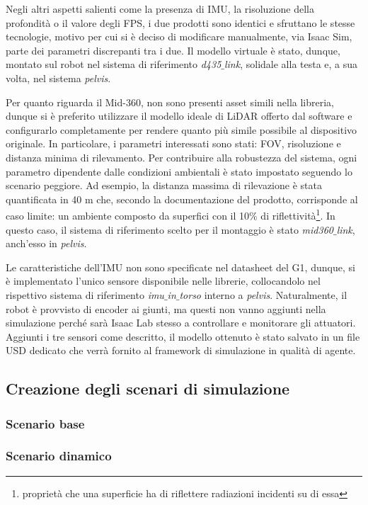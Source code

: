 Negli altri aspetti salienti come la presenza di IMU, la risoluzione della profondità o il valore degli FPS, i due prodotti sono identici e sfruttano le stesse tecnologie, motivo per cui si è deciso di modificare manualmente, via Isaac Sim, parte dei parametri discrepanti tra i due. Il modello virtuale è stato, dunque, montato sul robot nel sistema di riferimento \textit{d435$\_$link}, solidale alla testa e, a sua volta, nel sistema \textit{pelvis}. 

Per quanto riguarda il Mid-360, non sono presenti asset simili nella libreria, dunque si è preferito utilizzare il modello ideale di LiDAR offerto dal software e configurarlo completamente per rendere quanto più simile possibile al dispositivo originale. In particolare, i parametri interessati sono stati: FOV, risoluzione e distanza minima di rilevamento. Per contribuire alla robustezza del sistema, ogni parametro dipendente dalle condizioni ambientali è stato impostato seguendo lo scenario peggiore. Ad esempio, la distanza massima di rilevazione è stata quantificata in 40 m che, secondo la documentazione del prodotto, corrisponde al caso limite: un ambiente composto da superfici con il 10$\%$ di riflettività\footnote{proprietà che una superficie ha di riflettere radiazioni incidenti su di essa}.  In questo caso, il sistema di riferimento scelto per il montaggio è stato \textit{mid360$\_$link}, anch'esso in \textit{pelvis}.

Le caratteristiche dell'IMU non sono specificate nel datasheet del G1, dunque, si è implementato l'unico sensore disponibile nelle librerie, collocandolo nel rispettivo sistema di riferimento \textit{imu$\_$in$\_$torso} interno a \textit{pelvis}. Naturalmente, il robot è provvisto di encoder ai giunti, ma questi non vanno aggiunti nella simulazione perché sarà Isaac Lab stesso a controllare e monitorare gli attuatori. Aggiunti i tre sensori come descritto, il modello ottenuto è stato salvato in un file USD dedicato che verrà fornito al framework di simulazione in qualità di agente.


\subsection{Creazione degli scenari di simulazione}
\subsubsection{Scenario base}


\subsubsection{Scenario dinamico}


